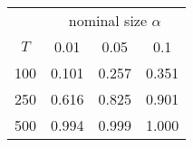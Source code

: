 % 
\begin{tabular}{cccc}
  \hline
  & \multicolumn{3}{c}{nominal size $\alpha$} \\
 $T$ & 0.01 & 0.05 & 0.1 \\
 \hline
100 & 0.101 & 0.257 & 0.351 \\ 
  250 & 0.616 & 0.825 & 0.901 \\ 
  500 & 0.994 & 0.999 & 1.000 \\ 
   \hline
\end{tabular}
